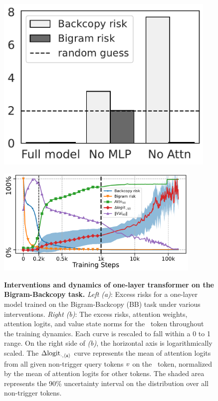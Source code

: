 \begin{figure}
  \centering
  \begin{minipage}{0.37\textwidth}
      \centering
      \label{fig:interventions}
      \includegraphics[width=0.94\textwidth]{Figures/BBM/interventions.pdf}
  \end{minipage}
  \begin{minipage}{0.6\textwidth}
      \centering
      \label{fig:dynamics}
    \includegraphics[width=0.87\textwidth]{Figures/BBM/dynamics_combine.pdf}
  \end{minipage}
  \hspace{-1em}
    \caption{\small \textbf{Interventions and dynamics of one-layer transformer on the Bigram-Backcopy task.}  \textit{Left (a)}: Excess risks for a one-layer model trained on the Bigram-Backcopy (BB) task under various interventions. \textit{Right (b)}: The excess risks, attention weights, attention logits, and value state norms for the \bos~token throughout the training dynamics. Each curve is rescaled to fall within a 0 to 1 range. On the right side of \textit{(b)}, the horizontal axis is logarithmically scaled. The $\Delta\text{logit}_{\cdot,\texttt{$\langle \texttt{s}\rangle$}}$ curve represents the mean of attention logits from all given non-trigger query tokens $v$ on the \bos~token, normalized by the mean of attention logits for other tokens. The shaded area represents the 90\% uncertainty interval on the distribution over all non-trigger tokens. 
}
\end{figure}
